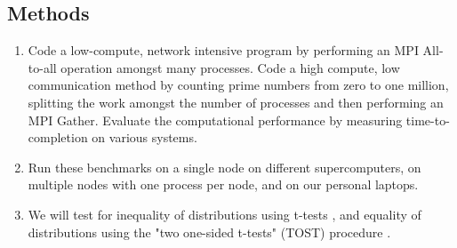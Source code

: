 \documentclass{article}
\begin{document}
\subsection{Methods}
\begin{enumerate}
    \item Code a low-compute, network intensive program by performing an MPI All-to-all operation amongst many processes. Code a high compute, low communication method by counting prime numbers from zero to one million, splitting the work amongst the number of processes and then performing an MPI Gather. Evaluate the computational performance by measuring time-to-completion on various systems.
    \item Run these benchmarks on a single node on different supercomputers, on multiple nodes with one process per node, and on our personal laptops.
    \item We will test for inequality of distributions using t-tests \cite{ttest}, and equality of distributions using the "two one-sided t-tests" (TOST) procedure \cite{tost}.
\end{enumerate}

\printbibliography
\end{document}

